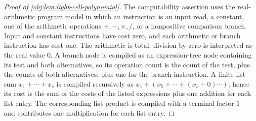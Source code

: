 \begin{proof}[Proof of \cref{obj:lem:light-cell-polynomial}]
The computability assertion uses the real-arithmetic program model in which an instruction is an input read, a constant, one of the arithmetic operations \(+, -, \times, /\), or a nonpositive comparison branch.  Input and constant instructions have cost zero, and each arithmetic or branch instruction has cost one.  The arithmetic is total: division by zero is interpreted as the real value \(0\).  A branch node is compiled as an expression-tree node containing its test and both alternatives, so its operation count is the count of the test, plus the counts of both alternatives, plus one for the branch instruction.  A finite list sum \(x_1+\cdots+x_s\) is compiled recursively as \(x_1+(x_2+\cdots+(x_s+0)\cdots)\); hence its cost is the sum of the costs of the listed expressions plus one addition for each list entry.  The corresponding list product is compiled with a terminal factor \(1\) and contributes one multiplication for each list entry.


\end{proof}
